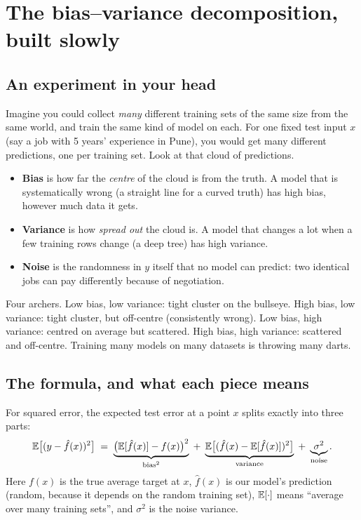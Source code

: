 \section{The bias--variance decomposition, built slowly}

\subsection{An experiment in your head}
Imagine you could collect \emph{many} different training sets of the same size from the same world, and
train the same kind of model on each. For one fixed test input $x$ (say a job with 5 years' experience in
Pune), you would get many different predictions, one per training set. Look at that cloud of predictions.
\begin{itemize}
\item \textbf{Bias} is how far the \emph{centre} of the cloud is from the truth. A model that is
  systematically wrong (a straight line for a curved truth) has high bias, however much data it gets.
\item \textbf{Variance} is how \emph{spread out} the cloud is. A model that changes a lot when a few
  training rows change (a deep tree) has high variance.
\item \textbf{Noise} is the randomness in $y$ itself that no model can predict: two identical jobs can
  pay differently because of negotiation.
\end{itemize}

\begin{intuition}
Four archers. Low bias, low variance: tight cluster on the bullseye. High bias, low variance: tight cluster,
but off-centre (consistently wrong). Low bias, high variance: centred on average but scattered. High bias,
high variance: scattered and off-centre. Training many models on many datasets is throwing many darts.
\end{intuition}

\subsection{The formula, and what each piece means}
For squared error, the expected test error at a point $x$ splits exactly into three parts:
\[
\mathbb{E}\big[(y - \hat f(x))^2\big] \;=\; \underbrace{\big(\mathbb{E}[\hat f(x)] - f(x)\big)^2}_{\text{bias}^2}
\;+\; \underbrace{\mathbb{E}\big[(\hat f(x) - \mathbb{E}[\hat f(x)])^2\big]}_{\text{variance}}
\;+\; \underbrace{\sigma^2}_{\text{noise}}.
\]
Here $f(x)$ is the true average target at $x$, $\hat f(x)$ is our model's prediction (random, because it
depends on the random training set), $\mathbb{E}[\cdot]$ means ``average over many training sets'', and $\sigma^2$
is the noise variance.

